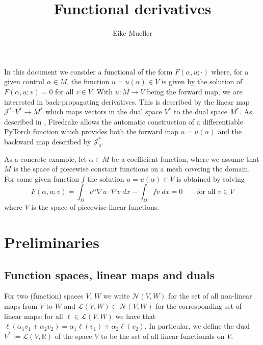 \documentclass[11pt]{article}
\title{Functional derivatives}
\author{Eike Mueller}
\begin{document}
\maketitle
In this document we consider a functional of the form $F(\alpha,u;\cdot)$ where, for a given control $\alpha\in M$, the function $u=u(\alpha)\in V$ is given by the solution of $F(\alpha,u;v) = 0$ for all $v\in V$. With $u:M\rightarrow V$ being the forward map, we are interested in back-propagating derivatives. This is described by the linear map $\mathcal{J}^*:V^* \rightarrow M^*$ which maps vectors in the dual space $V^*$ to the dual space $M^*$. As described in \cite{bouziani2023physics}, Firedrake allows the automatic construction of a differentiable PyTorch function which provides both the forward map $u=u(\alpha)$ and the backward map described by $\mathcal{J}^*_u$.

As a concrete example, let $\alpha\in M$ be a coefficient function, where we assume that $M$ is the space of piecewise constant functions on a mesh covering the domain. For some given function $f$ the solution $u=u(\alpha)\in V$ is obtained by solving
\begin{equation}
    F(\alpha,u;v) =\int_\Omega e^{\alpha}\nabla u \cdot \nabla v\;dx - \int_\Omega f v\; dx = 0 \qquad\text{for all $v\in V$}\label{eqn:F_definition}
\end{equation}
where $V$ is the space of piecewise linear functions.
\section{Preliminaries}
\subsection{Function spaces, linear maps and duals}
For two (function) spaces $V$, $W$ we write $\mathcal{N}(V,W)$ for the set of all non-linear maps from $V$ to $W$ and $\mathcal{L}(V,W)\subset \mathcal{N}(V,W)$ for the corresponding set of linear maps: for all $\ell\in\mathcal{L}(V,W)$ we have that $\ell(\alpha_1 v_1+\alpha_2 v_2) = \alpha_1\ell(v_1)+\alpha_2\ell(v_2)$. In particular, we define the dual $V^* := \mathcal{L}(V,\mathbb{R})$ of the space $V$ to be the set of all linear functionals on $V$.
\end{document}
